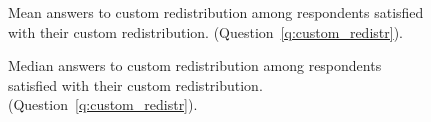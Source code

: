 \begin{figure}[h!]
    \caption[Average answers to custom redistribution among satisfied]{Mean answers to custom redistribution among respondents satisfied with their custom redistribution. (Question~\ref{q:custom_redistr}).
    }\label{fig:custom_redistr_satisfied_mean}
\end{figure} 

\begin{figure}[h!]
    \caption[Median answers to custom redistribution among satisfied]{Median answers to custom redistribution among respondents satisfied with their custom redistribution. (Question~\ref{q:custom_redistr}).
    }\label{fig:custom_redistr_satisfied_median}
\end{figure} 


